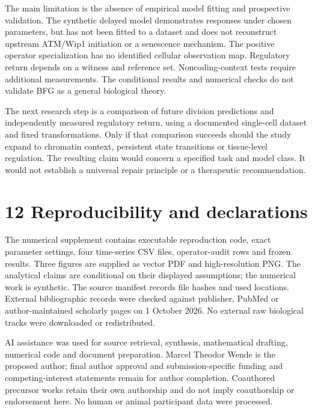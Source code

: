 \documentclass[11pt,a4paper]{article}
\begin{document}
The main limitation is the absence of empirical model fitting and prospective validation. The synthetic delayed model demonstrates responses under chosen parameters, but has not been fitted to a dataset and does not reconstruct upstream ATM/Wip1 initiation or a senescence mechanism. The positive operator specialization has no identified cellular observation map. Regulatory return depends on a witness and reference set. Noncoding-context tests require additional measurements. The conditional results and numerical checks do not validate BFG as a general biological theory.

The next research step is a comparison of future division predictions and independently measured regulatory return, using a documented single-cell dataset and fixed transformations. Only if that comparison succeeds should the study expand to chromatin context, persistent state transitions or tissue-level regulation. The resulting claim would concern a specified task and model class. It would not establish a universal repair principle or a therapeutic recommendation.

\section*{12 Reproducibility and declarations}
The numerical supplement contains executable reproduction code, exact parameter settings, four time-series CSV files, operator-audit rows and frozen results. Three figures are supplied as vector PDF and high-resolution PNG. The analytical claims are conditional on their displayed assumptions; the numerical work is synthetic. The source manifest records file hashes and used locations. External bibliographic records were checked against publisher, PubMed or author-maintained scholarly pages on 1 October 2026. No external raw biological tracks were downloaded or redistributed.

AI assistance was used for source retrieval, synthesis, mathematical drafting, numerical code and document preparation. Marcel Theodor Wende is the proposed author; final author approval and submission-specific funding and competing-interest statements remain for author completion. Coauthored precursor works retain their own authorship and do not imply coauthorship or endorsement here. No human or animal participant data were processed.

\clearpage
\end{document}
